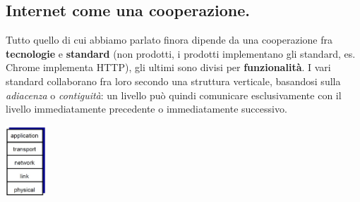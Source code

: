 \documentclass[10pt, a4paper, openany]{book}
\begin{document}
\subsection{Internet come una cooperazione.}
\noindent Tutto quello di cui abbiamo parlato finora dipende da una cooperazione fra \textbf{tecnologie} e \textbf{standard} (non prodotti, i prodotti implementano gli standard, es. Chrome implementa HTTP), gli ultimi sono divisi per \textbf{funzionalità}. I vari standard collaborano fra loro secondo una struttura verticale, basandosi sulla \textit{adiacenza} o \textit{contiguità}: un livello può quindi comunicare esclusivamente con il livello immediatamente precedente o immediatamente successivo.
\begin{center}
    \includegraphics[width=15mm]{cap1 - Introduzione alle reti - 19.jpg}
\end{center}
\end{document}
